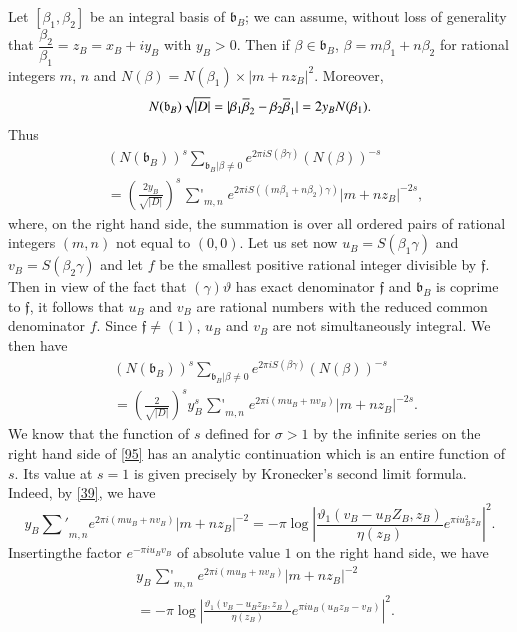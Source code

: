 Let $[\beta_{1},\beta_{2}]$ be an integral basis of
$\mathfrak{b}_{B}$; we can assume, without loss of generality that
$\dfrac{\beta_{2}}{\beta_{1}}=z_{B}=x_{B}+iy_{B}$ with $y_{B}>0$. Then
if $\beta\in\mathfrak{b}_{B}$, $\beta=m\beta_{1}+n\beta_{2}$ for
rational integers $m$, $n$ and $N(\beta)=N(\beta_{1})\times
|m+nz_{B}|^{2}$. Moreover,
$$
N(\mathfrak{b}_{B})\sqrt{|D|}=|\beta_{1}\overline{\beta}_{2}-\beta_{2}\overline{\beta}_{1}|=2y_{B}N(\beta_{1}).
$$
Thus
\begin{align*}
& (N(\mathfrak{b}_{B}))^{s}\sum_{\mathfrak{b}_{B}|\beta\neq 0}e^{2\pi iS(\beta\gamma)}(N(\beta))^{-s}\\
&=
  \left(\frac{2y_{B}}{\sqrt{|D|}}\right)^{s}\mathop{{\sum}'}_{m,n}e^{2\pi
    iS((m\beta_{1}+n\beta_{2})\gamma)}|m+nz_{B}|^{-2s}, 
\end{align*}
where, on the right hand side, the summation is over all ordered pairs
of rational integers $(m,n)$ not equal to $(0,0)$. Let us set now
$u_{B}=S(\beta_{1}\gamma)$ and $v_{B}=S(\beta_{2}\gamma)$ and let $f$
be the smallest positive rational integer divisible by
$\mathfrak{f}$. Then in view of the fact that $(\gamma)\vartheta$ has
exact denominator $\mathfrak{f}$ and $\mathfrak{b}_{B}$ is coprime to
$\mathfrak{f}$, it follows that $u_{B}$ and $v_{B}$ are rational
numbers with the reduced common denominator $f$. Since
$\mathfrak{f}\neq (1)$, $u_{B}$ and $v_{B}$ are not simultaneously
integral. We then have
\begin{align*}
& (N(\mathfrak{b}_{B}))^{s}\sum_{\mathfrak{b}_{B}|\beta\neq 0}e^{2\pi
    iS(\beta\gamma)}(N(\beta))^{-s}\\
&=
  \left(\frac{2}{\sqrt{|D|}}\right)^{s}y^{s}_{B}\mathop{{\sum}'}_{m,n}e^{2\pi
    i(mu_{B}+nv_{B})}|m+nz_{B}|^{-2s}.\tag{95}\label{95} 
\end{align*}
We know that the function of $s$ defined for $\sigma>1$ by the
infinite series on the right hand side of \eqref{95} has an analytic
continuation which is an entire function of $s$. Its value at $s=1$ is
given precisely by Kronecker's second limit formula. Indeed, by
\eqref{39}, we have
$$
y_{B}{\mathop{\sum}'}_{m,n}e^{2\pi
  i(mu_{B}+nv_{B})}|m+nz_{B}|^{-2}=-\pi
\log\left|\frac{\vartheta_{1}(v_{B}-u_{B}Z_{B},z_{B})}{\eta(z_{B})}e^{\pi
  iu^{2}_{B}z_{B}}\right|^{2}.
$$
Inserting\pageoriginale the factor $e^{-\pi iu_{B}v_{B}}$ of absolute
value $1$ on the right hand side, we have
\begin{align*}
& y_{B}\mathop{{\sum}'}_{m,n}e^{2\pi
    i(mu_{B}+nv_{B})}|m+nz_{B}|^{-2}\\
&=
  -\pi\log\left|\frac{\vartheta_{1}(v_{B}-u_{B}z_{B},z_{B})}{\eta(z_{B})}e^{\pi iu_{B}(u_{B}z_{B}-v_{B})}\right|^{2}.\tag{96}\label{96}
\end{align*}


